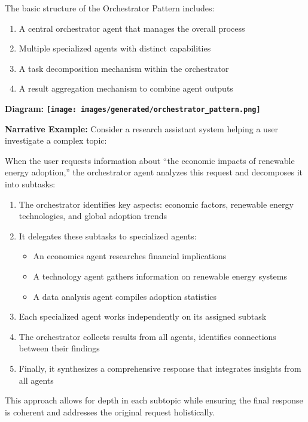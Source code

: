 \documentclass[11pt,oneside]{book}
\providecommand{\pandocbounded}[1]{\textbf{#1}}
\providecommand{\tightlist}{%
  \setlength{\itemsep}{0pt}\setlength{\parskip}{0pt}}
\begin{document}
The basic structure of the Orchestrator Pattern includes:

\begin{enumerate}
\def\labelenumi{\arabic{enumi}.}
\tightlist
\item
  A central orchestrator agent that manages the overall process
\item
  Multiple specialized agents with distinct capabilities
\item
  A task decomposition mechanism within the orchestrator
\item
  A result aggregation mechanism to combine agent outputs
\end{enumerate}

\textbf{Diagram:}
\pandocbounded{\texttt{[image: images/generated/orchestrator\_pattern.png]}}

\textbf{Narrative Example:} Consider a research assistant system helping
a user investigate a complex topic:

When the user requests information about ``the economic impacts of
renewable energy adoption,'' the orchestrator agent analyzes this
request and decomposes it into subtasks:

\begin{enumerate}
\def\labelenumi{\arabic{enumi}.}
\tightlist
\item
  The orchestrator identifies key aspects: economic factors, renewable
  energy technologies, and global adoption trends
\item
  It delegates these subtasks to specialized agents:

  \begin{itemize}
  \tightlist
  \item
    An economics agent researches financial implications
  \item
    A technology agent gathers information on renewable energy systems
  \item
    A data analysis agent compiles adoption statistics
  \end{itemize}
\item
  Each specialized agent works independently on its assigned subtask
\item
  The orchestrator collects results from all agents, identifies
  connections between their findings
\item
  Finally, it synthesizes a comprehensive response that integrates
  insights from all agents
\end{enumerate}

This approach allows for depth in each subtopic while ensuring the final
response is coherent and addresses the original request holistically.
\end{document}
